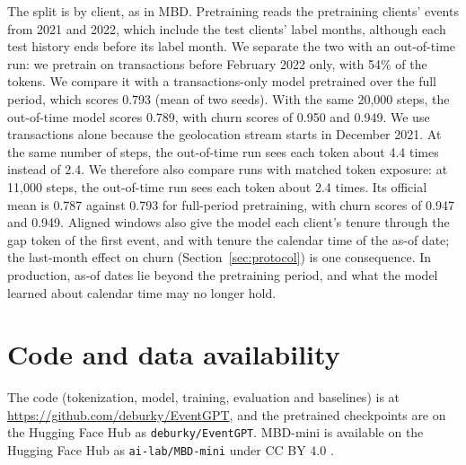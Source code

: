 \documentclass[12pt]{article}
\newcommand{\tok}[1]{\texttt{#1}}
\begin{document}
The split is by client, as in MBD. Pretraining reads the pretraining clients' events from 2021 and 2022, which include the test clients' label months, although each test history ends before its label month. We separate the two with an out-of-time run: we pretrain on transactions before February 2022 only, with 54\% of the tokens. We compare it with a transactions-only model pretrained over the full period, which scores 0.793 (mean of two seeds). With the same 20,000 steps, the out-of-time model scores 0.789, with churn scores of 0.950 and 0.949. We use transactions alone because the geolocation stream starts in December 2021. At the same number of steps, the out-of-time run sees each token about 4.4 times instead of 2.4. We therefore also compare runs with matched token exposure: at 11,000 steps, the out-of-time run sees each token about 2.4 times. Its official mean is 0.787 against 0.793 for full-period pretraining, with churn scores of 0.947 and 0.949. Aligned windows also give the model each client's tenure through the gap token of the first event, and with tenure the calendar time of the as-of date; the last-month effect on churn (Section~\ref{sec:protocol}) is one consequence. In production, as-of dates lie beyond the pretraining period, and what the model learned about calendar time may no longer hold.

\section{Code and data availability}\label{app:code}

The code (tokenization, model, training, evaluation and baselines) is at \url{https://github.com/deburky/EventGPT}, and the pretrained checkpoints are on the Hugging Face Hub as \tok{deburky/EventGPT}. MBD-mini is available on the Hugging Face Hub as \tok{ai-lab/MBD-mini} under CC BY 4.0 \cite{mbdmini}.
\end{document}
